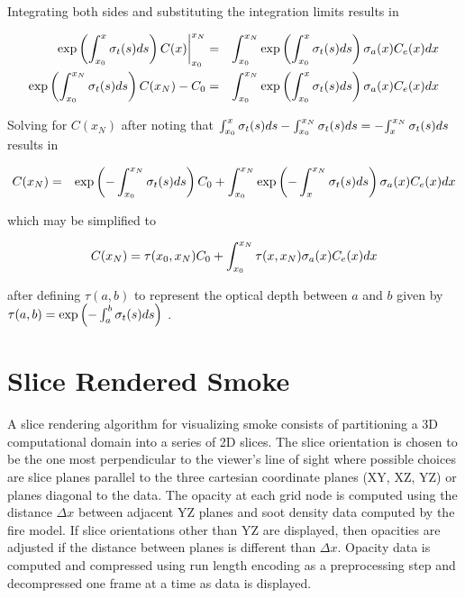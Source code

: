 Integrating both sides and substituting the integration limits results in

\begin{eqnarray*}
\left.\exp\left({\int_{x_0}^{x} \sigma_t(s) ds}\right) C(x)\right|_{x_0}^{x_N}&=& \int_{x_0}^{x_N}\exp\left({\int_{x_0}^{x} \sigma_t(s) ds}\right)\sigma_a(x) C_e(x) dx \\
\exp\left({\int_{x_0}^{x_N} \sigma_t(s) ds}\right) C(x_N)-C_0&=& \int_{x_0}^{x_N}\exp\left({\int_{x_0}^{x} \sigma_t(s) ds}\right)\sigma_a(x) C_e(x) dx
\end{eqnarray*}

Solving for $C(x_N)$ after noting that ${\int_{x_0}^{x} \sigma_t(s) ds}-{\int_{x_0}^{x_N} \sigma_t(s) ds}=-{\int_{x}^{x_N} \sigma_t(s) ds}$ results in

\begin{eqnarray*}
C(x_N)&=&\exp\left({-\int_{x_0}^{x_N} \sigma_t(s) ds}\right) C_0+ \int_{x_0}^{x_N}\exp\left({-\int_{x}^{x_N} \sigma_t(s) ds}\right)\sigma_a(x) C_e(x) dx\\
\end{eqnarray*}

which may be simplified to

\begin{equation}
 C(x_N)=\tau(x_0,x_N)C_0 + \int_{x_0}^{x_N}\tau(x,x_N)\sigma_a(x)C_e(x) dx
\end{equation}

after defining $\tau(a,b)$ to represent the optical depth between $a$ and $b$ given by $\tau(a,b)=\exp\left({-\int_{a}^{b} \sigma_t(s) ds}\right)$ .

%
%

\section{Slice Rendered Smoke}
A slice rendering algorithm for visualizing smoke consists of partitioning a 3D computational domain into a series of 2D slices.  The slice orientation is chosen to be the one most perpendicular to the viewer's line of sight where possible choices are slice planes parallel to the three cartesian coordinate planes (XY, XZ, YZ) or planes diagonal to the data.  The opacity at each grid node is computed using the distance $\Delta x$ between adjacent YZ planes and soot density data computed by the fire model.  If slice orientations other than YZ are displayed, then opacities are adjusted if the distance between planes is different than $\Delta x$.  Opacity data is computed and compressed using run length encoding as a preprocessing step and decompressed one frame at a time as data is displayed.


%
%


